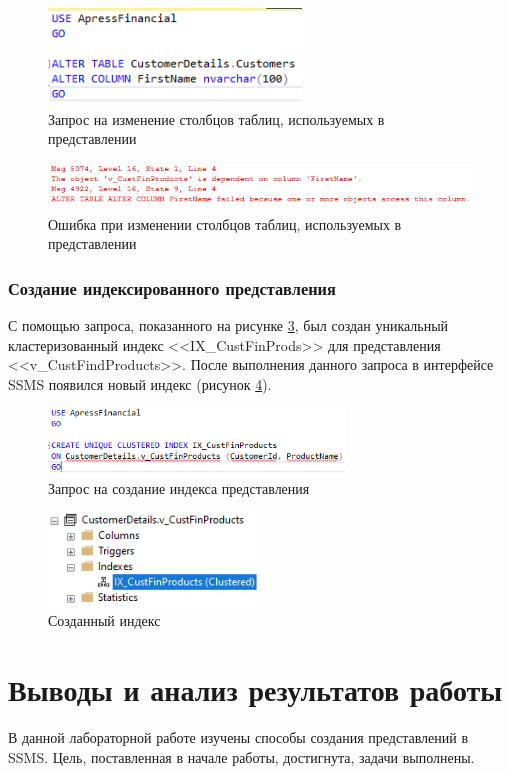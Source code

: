 \documentclass[a4paper, 14pt]{extarticle}
\begin{document}
\begin{figure}[H]
  \centering
  \includegraphics[width=0.6\textwidth]{images/task-3/7.png}
  \caption{Запрос на изменение столбцов таблиц, используемых в представлении}
  \label{fig:task-3-7}
\end{figure}

\begin{figure}[H]
  \centering
  \includegraphics[width=\textwidth]{images/task-3/8.png}
  \caption{Ошибка при изменении столбцов таблиц, используемых в представлении}
  \label{fig:task-3-8}
\end{figure}

\subsubsection{Создание индексированного представления}

С помощью запроса, показанного на рисунке \ref{fig:task-3-9}, был создан
уникальный кластеризованный индекс
<<\foreignlanguage{english}{IX\_CustFinProds}>> для представления
<<\foreignlanguage{english}{v\_CustFindProducts}>>. После выполнения данного
запроса в интерфейсе SSMS появился новый индекс (рисунок \ref{fig:task-3-10}).

\begin{figure}[H]
  \centering
  \includegraphics[width=0.7\textwidth]{images/task-3/9.png}
  \caption{Запрос на создание индекса представления}
  \label{fig:task-3-9}
\end{figure}

\begin{figure}[H]
  \centering
  \includegraphics[width=0.5\textwidth]{images/task-3/10.png}
  \caption{Созданный индекс}
  \label{fig:task-3-10}
\end{figure}

\section{Выводы и анализ результатов работы}

В данной лабораторной работе изучены способы создания представлений в SSMS.
Цель, поставленная в начале работы, достигнута, задачи выполнены.
\end{document}
